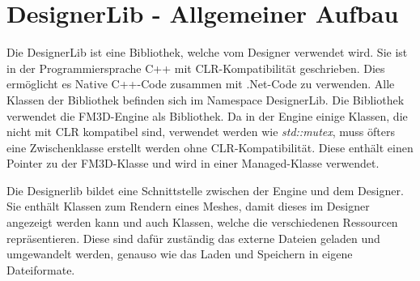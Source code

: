 \section{DesignerLib - Allgemeiner Aufbau}

Die DesignerLib ist eine Bibliothek, welche vom Designer verwendet wird. Sie ist in der Programmiersprache C++ mit \ac{CLR}-Kompatibilität geschrieben. Dies ermöglicht es Native C++-Code zusammen mit .Net-Code zu verwenden. Alle Klassen der Bibliothek befinden sich im Namespace DesignerLib. Die Bibliothek verwendet die FM3D-Engine als Bibliothek. Da in der Engine einige Klassen, die nicht mit \ac{CLR} kompatibel sind, verwendet werden wie \textit{std::mutex}, muss öfters eine Zwischenklasse erstellt werden ohne \ac{CLR}-Kompatibilität. Diese enthält einen Pointer zu der FM3D-Klasse und wird in einer Managed-Klasse verwendet.

Die Designerlib bildet eine Schnittstelle zwischen der Engine und dem Designer. Sie enthält Klassen zum Rendern eines Meshes, damit dieses im Designer angezeigt werden kann und auch Klassen, welche die verschiedenen Ressourcen repräsentieren. Diese sind dafür zuständig das externe Dateien geladen und umgewandelt werden, genauso wie das Laden und Speichern in eigene Dateiformate. 